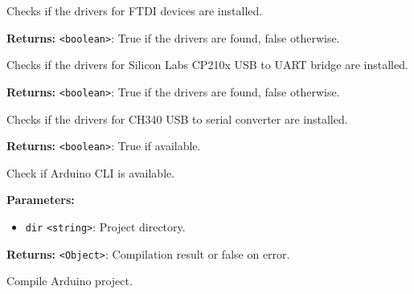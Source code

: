 \documentclass[12pt,a4paper]{article}
\begin{document}
\noindent Checks if the drivers for FTDI devices are installed.

\vspace{5mm}
\noindent {}


\noindent \textbf{Returns:} \texttt{<boolean>}: True if the drivers are found, false otherwise.

\noindent Checks if the drivers for Silicon Labs CP210x USB to UART bridge are installed.

\vspace{5mm}
\noindent {}


\noindent \textbf{Returns:} \texttt{<boolean>}: True if the drivers are found, false otherwise.

\noindent Checks if the drivers for CH340 USB to serial converter are installed.

\vspace{5mm}
\noindent {}


\noindent \textbf{Returns:} \texttt{<boolean>}: True if available.

\noindent Check if Arduino CLI is available.

\vspace{5mm}
\noindent {}


\noindent \textbf{Parameters:}
\begin{itemize}
  \item \texttt{dir} \texttt{<string>}: Project directory.
\end{itemize}

\noindent \textbf{Returns:} \texttt{<Object>}: Compilation result or false on error.

\noindent Compile Arduino project.

\vspace{5mm}
\noindent {}
\end{document}
